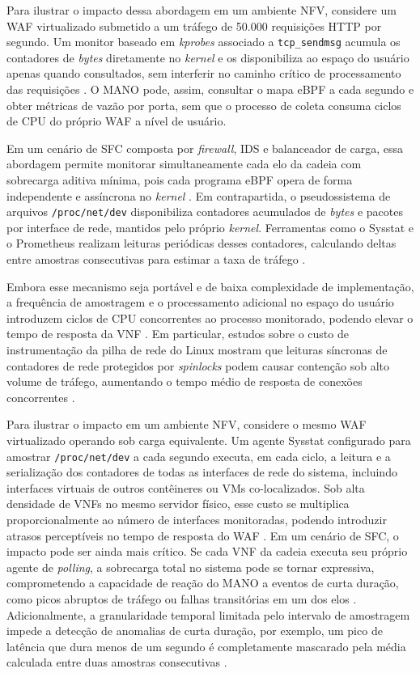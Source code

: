 Para ilustrar o impacto dessa abordagem em um ambiente NFV, considere um WAF virtualizado submetido a um tráfego de 50.000 requisições HTTP por segundo. Um monitor baseado em \textit{kprobes} associado a \texttt{tcp\_sendmsg} acumula os contadores de \textit{bytes} diretamente no \textit{kernel} e os disponibiliza ao espaço do usuário apenas quando consultados, sem interferir no caminho crítico de processamento das requisições \cite{10.1109/NOMS47738.2020.9110434}. O MANO pode, assim, consultar o mapa eBPF a cada segundo e obter métricas de vazão por porta, sem que o processo de coleta consuma ciclos de CPU do próprio WAF a nível de usuário.

Em um cenário de SFC composta por \textit{firewall}, IDS e balanceador de carga, essa abordagem permite monitorar simultaneamente cada elo da cadeia com sobrecarga aditiva mínima, pois cada programa eBPF opera de forma independente e assíncrona no \textit{kernel} \cite{kannan2024designing}.
Em contrapartida, o pseudossistema de arquivos \texttt{/proc/net/dev} disponibiliza contadores acumulados de \textit{bytes} e pacotes por interface de rede, mantidos pelo próprio \textit{kernel}. Ferramentas como o Sysstat e o Prometheus realizam leituras periódicas desses contadores, calculando deltas entre amostras consecutivas para estimar a taxa de tráfego \cite{godard2024sysstat}.

Embora esse mecanismo seja portável e de baixa complexidade de implementação, a frequência de amostragem e o processamento adicional no espaço do usuário introduzem ciclos de CPU concorrentes ao processo monitorado, podendo elevar o tempo de resposta da VNF \cite{10.1109/NOMS47738.2020.9110434}. Em particular, estudos sobre o custo de instrumentação da pilha de rede do Linux mostram que leituras síncronas de contadores de rede protegidos por \textit{spinlocks} podem causar contenção sob alto volume de tráfego, aumentando o tempo médio de resposta de conexões concorrentes \cite{10.1145/3452296.3472888}.

Para ilustrar o impacto em um ambiente NFV, considere o mesmo WAF virtualizado operando sob carga equivalente. Um agente Sysstat configurado para amostrar \texttt{/proc/net/dev} a cada segundo executa, em cada ciclo, a leitura e a serialização dos contadores de todas as interfaces de rede do sistema, incluindo interfaces virtuais de outros contêineres ou VMs co-localizados. Sob alta densidade de VNFs no mesmo servidor físico, esse custo se multiplica proporcionalmente ao número de interfaces monitoradas, podendo introduzir atrasos perceptíveis no tempo de resposta do WAF \cite{10.1145/3452296.3472888}. Em um cenário de SFC, o impacto pode ser ainda mais crítico. Se cada VNF da cadeia executa seu próprio agente de \textit{polling}, a sobrecarga total no sistema pode se tornar expressiva, comprometendo a capacidade de reação do MANO a eventos de curta duração, como picos abruptos de tráfego ou falhas transitórias em um dos elos \cite{oliveira_observability_2026, 10.23919}. Adicionalmente, a granularidade temporal limitada pelo intervalo de amostragem impede a detecção de anomalias de curta duração, por exemplo, um pico de latência que dura menos de um segundo é completamente mascarado pela média calculada entre duas amostras consecutivas \cite{epping2024rtt}.

